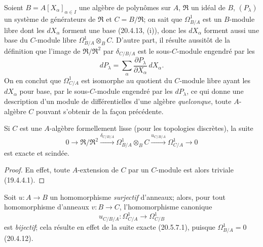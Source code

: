 \begin{example}[20.5.13]
\label{0.20.5.13-fr}
Soient $B=A[X_\alpha]_{\alpha\in I}$ une algèbre de polynômes sur $A$,
$\mathfrak{R}$ un idéal de $B$, $(P_\lambda)$ un système de générateurs
de $\mathfrak{R}$ et $C=B/\mathfrak{R}$; on sait que
$\Omega^1_{B/A}$ est un $B$-module libre dont les $dX_\alpha$ forment une
base (20.4.13, (i)), donc les $dX_\alpha$ forment aussi une base du
$C$-module libre $\Omega^1_{B/A}\otimes_B C$. D'autre part, il résulte
aussitôt de la définition que l'image de
$\mathfrak{R}/\mathfrak{R}^2$ par $\delta_{C/B/A}$ est le sous-$C$-module
engendré par les
\[
  dP_\lambda=\sum_\alpha
  \frac{\partial P_\lambda}{\partial X_\alpha}\,dX_\alpha.
\]
On en conclut que $\Omega^1_{C/A}$ est isomorphe au quotient du
$C$-module libre ayant les $dX_\alpha$ pour base, par le sous-$C$-module
engendré par les $dP_\lambda$, ce qui donne une description d'un module
de différentielles d'une algèbre \emph{quelconque}, toute $A$-algèbre
$C$ pouvant s'obtenir de la façon précédente.
\end{example}

\begin{corollary}[20.5.14]
\label{0.20.5.14-fr}
Si $C$ est une $A$-algèbre formellement lisse (pour les topologies
discrètes), la suite
\begin{equation}
\tag{20.5.14.1}
\label{0.20.5.14.1-fr}
  0\longrightarrow\mathfrak{R}/\mathfrak{R}^2
  \xrightarrow{\delta_{C/B/A}}\Omega^1_{B/A}\otimes_B C
  \xrightarrow{u_{C/B/A}}\Omega^1_{C/A}\longrightarrow0
\end{equation}
est exacte et scindée.
\end{corollary}

\begin{proof}
En effet, toute $A$-extension de $C$ par un $C$-module est alors triviale
(19.4.4.1).
\end{proof}

\begin{remark}[20.5.15]
\label{0.20.5.15-fr}
Soit $u:A\to B$ un homomorphisme \emph{surjectif} d'anneaux; alors, pour
tout homomorphisme d'anneaux $v:B\to C$, l'homomorphisme canonique
\begin{equation}
\tag{20.5.15.1}
\label{0.20.5.15.1-fr}
  u_{C/B/A}:\Omega^1_{C/A}\longrightarrow\Omega^1_{C/B}
\end{equation}
est \emph{bijectif}; cela résulte en effet de la suite exacte (20.5.7.1),
puisque $\Omega^1_{B/A}=0$ (20.4.12).
\end{remark}

